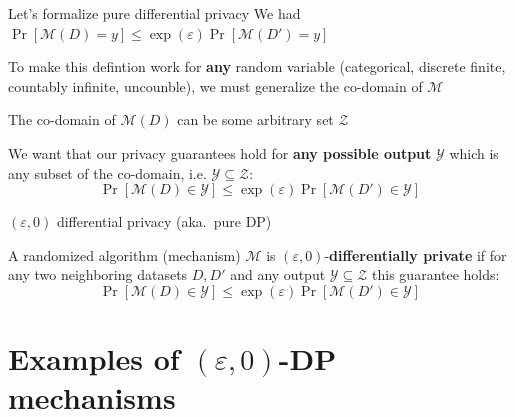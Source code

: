 \documentclass[12pt,aspectratio=169,handout]{beamer}
\begin{document}
\begin{frame}{Let's formalize pure differential privacy}
We had $\Pr[\mathcal{M}(D) = y] \leq \exp(\varepsilon) \Pr[\mathcal{M}(D') = y]$

To make this defintion work for \textbf{any} random variable (categorical, discrete finite, countably infinite, uncounble), we must generalize the co-domain of $\mathcal{M}$

The co-domain of $\mathcal{M}(D)$ can be some arbitrary set $\mathcal{Z}$

We want that our privacy guarantees hold for \textbf{any possible output} $\mathcal{Y}$ which is any subset of the co-domain, i.e. $\mathcal{Y} \subseteq \mathcal{Z}$:
$$
\Pr[\mathcal{M}(D) \in \mathcal{Y}] \leq \exp(\varepsilon) \Pr[\mathcal{M}(D') \in \mathcal{Y}]
$$


\end{frame}


\begin{frame}{$(\varepsilon, 0)$ differential privacy (aka.\ pure DP)}

A randomized algorithm (mechanism) $\mathcal{M}$ is $(\varepsilon, 0)$-\textbf{differentially private} if for any two neighboring datasets $D, D'$ and any output $\mathcal{Y} \subseteq \mathcal{Z}$ this guarantee holds:
$$
\Pr[\mathcal{M}(D) \in \mathcal{Y}] \leq \exp(\varepsilon) \Pr[\mathcal{M}(D') \in \mathcal{Y}]
$$


\end{frame}


\section{Examples of $(\varepsilon, 0)$-DP mechanisms}
\end{document}
